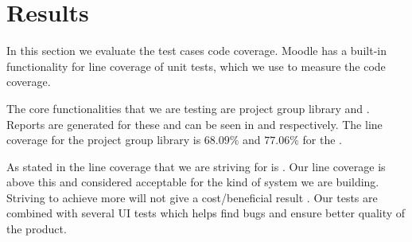 \section{Results}
\label{sec:results}
In this section we evaluate the test cases code coverage. 
Moodle has a built-in functionality for line coverage of unit tests, which we use to measure the code coverage.

The core functionalities that we are testing are project group library and \admlib{}.
Reports are generated for these and can be seen in  and  respectively.
The line coverage for the project group library is $68.09\%$ and $77.06\%$ for the \admlib{}.

As stated in  the line coverage that we are striving for is \idealCC{}.
Our line coverage is above this and considered acceptable for the kind of system we are building. 
Striving to achieve more will not give a cost/beneficial result .
Our tests are combined with several UI tests which helps find bugs and ensure better quality of the product. 